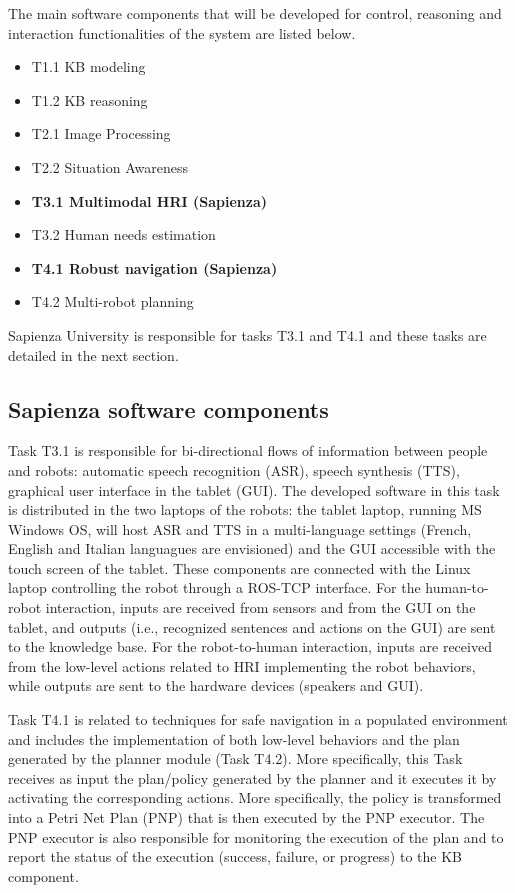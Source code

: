\documentclass{article}
\begin{document}
The main software components that will be developed for control, reasoning and interaction functionalities of the system are listed below.

\begin{itemize}
\item T1.1 KB modeling
\item T1.2 KB reasoning
\item T2.1 Image Processing
\item T2.2 Situation Awareness
\item {\bf T3.1 Multimodal HRI (Sapienza)}
\item T3.2 Human needs estimation
\item {\bf T4.1 Robust navigation (Sapienza)}
\item T4.2 Multi-robot planning
\end{itemize}

Sapienza University is responsible for tasks T3.1 and T4.1 and these tasks are detailed in the next section.

\subsection{Sapienza software components}


Task T3.1 is responsible for bi-directional flows of information between people and robots: automatic speech recognition (ASR), speech synthesis (TTS), graphical user interface in the tablet (GUI). The developed software in this task is distributed in the two laptops of the robots: the tablet laptop, running MS Windows OS, will host ASR and TTS in a multi-language settings (French, English and Italian languagues are envisioned) and the GUI accessible with the touch screen of the tablet. These components are connected with the Linux laptop controlling the robot through a ROS-TCP interface. 
For the human-to-robot interaction, inputs are received from sensors and from the GUI on the tablet, and outputs (i.e., recognized sentences and actions on the GUI) are sent to the knowledge base. 
For the robot-to-human interaction, inputs are received from the low-level actions related to HRI implementing the robot behaviors, while outputs are sent to the hardware devices (speakers and GUI).


Task T4.1 is related to techniques for safe navigation in a populated environment and includes the implementation of both low-level behaviors and the plan generated by the planner module (Task T4.2). 
More specifically, this Task receives as input the plan/policy generated by the planner and it executes it by activating the corresponding actions. More specifically, the policy is transformed  into a Petri Net Plan (PNP) that is then executed by the PNP executor. The PNP executor is also responsible for monitoring the execution of the plan and to report the status of the execution (success, failure, or progress) to the KB component.
\end{document}
